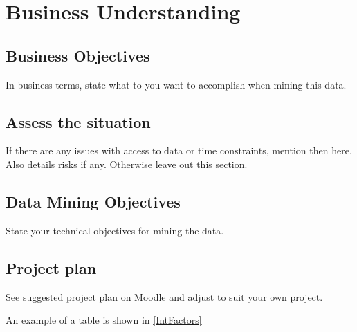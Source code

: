 
\chapter{Business Understanding}
\label{chpt:BU}
\graphicspath{{Chapter1/Chapter1Figs/PNG/}{Chapter1/Chapter1Figs/PDF/}{Chapter1/Chapter1Figs/}}



\section{Business Objectives}

In business terms, state what to you want to accomplish when mining this data.


\section{Assess the situation}

If there are any issues with access to data or time constraints, mention then here. Also details risks if any. Otherwise leave out this section.


\section{Data Mining Objectives}

State your technical objectives for mining the data.



\section{Project plan}
See suggested project plan on Moodle and adjust to suit your own project.

An example of a table is shown in \ref{IntFactors} 


